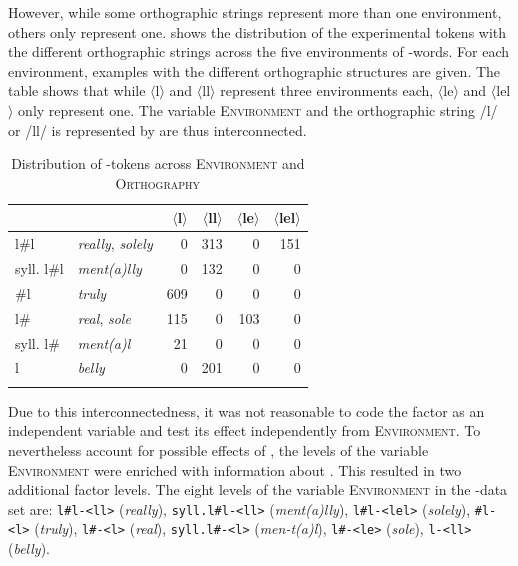  However, while some orthographic strings represent more than one environment, others only represent one. 
 shows the distribution of the experimental tokens with the different orthographic strings across the five environments of -words. For each environment, examples with the different orthographic structures are given.
The table shows that while $\langle$l$\rangle$ and  $\langle$ll$\rangle$  represent three environments each,  $\langle$le$\rangle$ and $\langle$lel$\rangle$ only represent one. 
The variable \textsc{Environment} and the orthographic string /l/ or /ll/ is represented by are thus interconnected. 


\begin{table}
	\caption{Distribution of -tokens across \textsc{Environment} and \textsc{Orthography}}
	\label{tab: ly dazta ortho and environment}
	
	
		\begin{tabular}{>{\ttfamily}llrrrr}
				\lsptoprule
			&      & $\langle$l$\rangle$  & $\langle$ll$\rangle$ & $\langle$le$\rangle$ & $\langle$lel$\rangle$ \\
			\midrule
			l\#l  &\textit{really}, \textit{solely}   
			&       0 &     313  &   0&    151\\
			
			syll. l\#l &\textit{ment(a)lly}   &   0 &     132    &   0 &   0\\
			
			\#l   &\textit{truly} &        609   &   0    &   0  &    0\\
			
			l\#   &\textit{real}, \textit{sole} &        115&   0  &         103& 0\\
			
			syll. l\#&\textit{ment(a)l} &         21&   0  &    0 &     0\\
			
			l        &\textit{belly}  &    0 &    201    &   0 &   0\\
			\lspbottomrule                                                                                
		\end{tabular}
	
\end{table}

 Due to this interconnectedness, it was not reasonable to code the factor  as an independent variable and test its effect independently from \textsc{Environment}. 
 To nevertheless account for possible effects of , the levels of the variable \textsc{Environment} were enriched with information about . 
This resulted in two additional factor levels.\largerpage
   The eight levels of the variable \textsc{Environment} in the -data set are: \texttt{l\#l-<ll>} (\textit{really}), \texttt{syll.l\#l-<ll>} (\textit{ment(a)lly}), \texttt{l\#l-<lel>} (\textit{solely}), \texttt{\#l-<l>} (\textit{truly}), \texttt{l\#-<l>} (\textit{real}), \texttt{syll.l\#-<l>} (\textit{men-t(a)l}),  \texttt{l\#-<le>} (\textit{sole}), \texttt{l-<ll> }(\textit{belly}). 		


